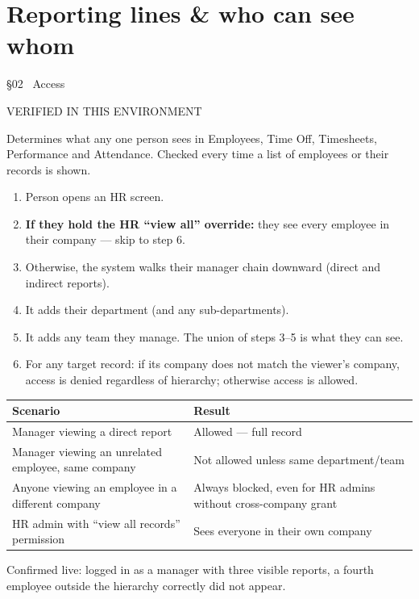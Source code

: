 \documentclass[11pt,a4paper]{article}
\newcommand{\eyebrow}[1]{{\small\ttfamily\color{accentdark} #1}\par\vspace{2pt}}
\begin{document}
\section{Reporting lines \& who can see whom}
\eyebrow{\S02 \textperiodcentered\ Access}
\begin{statusbox}{VERIFIED IN THIS ENVIRONMENT}\end{statusbox}

Determines what any one person sees in Employees, Time Off, Timesheets, Performance and Attendance. Checked every time a list of employees or their records is shown.

\begin{enumerate}[leftmargin=1.8em]
  \item Person opens an HR screen.
  \item \textbf{If they hold the HR ``view all'' override:} they see every employee in their company --- skip to step 6.
  \item Otherwise, the system walks their manager chain downward (direct and indirect reports).
  \item It adds their department (and any sub-departments).
  \item It adds any team they manage. The union of steps 3--5 is what they can see.
  \item For any target record: if its company does not match the viewer's company, access is denied regardless of hierarchy; otherwise access is allowed.
\end{enumerate}

\begin{center}
\small
\begin{tabular}{@{}p{7.2cm}p{6.3cm}@{}}
\toprule
\textbf{Scenario} & \textbf{Result} \\
\midrule
Manager viewing a direct report & Allowed --- full record \\
Manager viewing an unrelated employee, same company & Not allowed unless same department/team \\
Anyone viewing an employee in a different company & Always blocked, even for HR admins without cross-company grant \\
HR admin with ``view all records'' permission & Sees everyone in their own company \\
\bottomrule
\end{tabular}
\end{center}

\begin{note}
Confirmed live: logged in as a manager with three visible reports, a fourth employee outside the hierarchy correctly did not appear.
\end{note}
\end{document}
